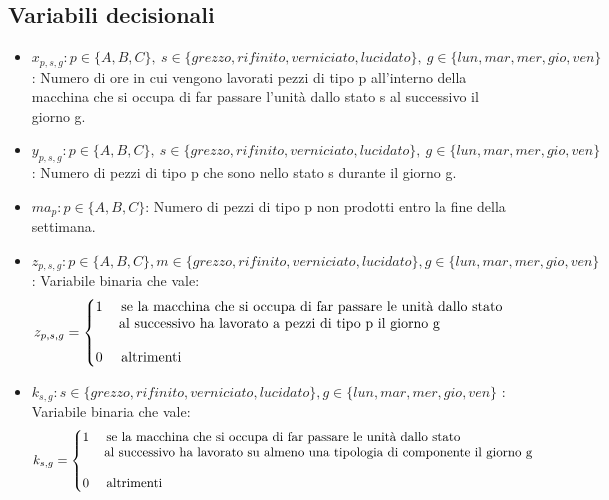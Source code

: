 \documentclass[12pt]{article}
\makeatletter
\newenvironment{sistema}%
{\left\lbrace\begin{array}{@{}l@{}}}%
	{\end{array}\right.}
\makeatother
\begin{document}
	\subsection{Variabili decisionali}
	\begin{itemize}
		\item \( x_{p,s,g} : p \in \{A, B, C\},\ s \in \{grezzo, rifinito, verniciato, lucidato\},\ g \in \{lun, mar, mer, gio, ven\}\): Numero di ore in cui vengono lavorati pezzi di tipo p all'interno della macchina che si occupa di far passare l'unità dallo stato s al successivo il giorno g.
		\item \( y_{p,s,g} : p \in \{A, B, C\},\ s \in \{grezzo, rifinito, verniciato, lucidato\},\ g \in \{lun, mar, mer, gio, ven\}\): Numero di pezzi di tipo p che sono nello stato s durante il giorno g.
		\item\(ma_p : p \in \{ A,B,C\} \): Numero di pezzi di tipo p non prodotti entro la fine della settimana.
		\item \( z_{p,s,g} : p \in \{A, B, C\},m \in \{grezzo, rifinito, verniciato, lucidato\},g \in \{lun, mar, mer, gio, ven\}\): Variabile binaria che vale:
		\[ 
			z_{p,s,g}=
			\begin{sistema} 
				\textrm{1 \quad se la macchina che si occupa di far passare le unità dallo stato }\\
				\textrm{\ \ \quad al successivo ha lavorato a pezzi di tipo p il giorno g}\\ \\
				\textrm{0 \quad altrimenti} \\ 
			\end{sistema} 
		\]
		\item \( k_{s,g} : s \in \{grezzo, rifinito, verniciato, lucidato\}, g \in \{lun, mar, mer, gio, ven\} \) : Variabile binaria che vale:
		\[ 
			k_{s,g}=
			\begin{sistema} 
				\textrm{1 \quad se la macchina che si occupa di far passare le unità dallo stato}\\
				\textrm{\ \ \quad al successivo ha lavorato su almeno una tipologia di componente il giorno g}\\ \\
				\textrm{0 \quad altrimenti}
			\end{sistema} 
		\]
	\end{itemize}
\end{document}
